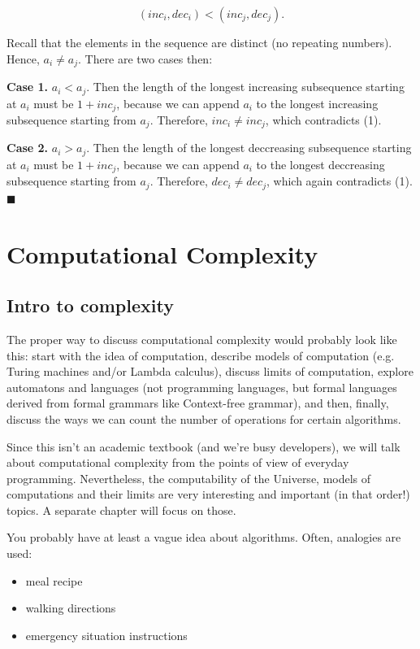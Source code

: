 \documentclass[a4paper, justified, notitlepage, sfsidenotes, notoc]{tufte-book}
\begin{document}
\begin{equation}
(inc_{i}, dec_{i}) < (inc_{j}, dec_{j}).
\end{equation}

Recall that the elements in the sequence are distinct (no repeating numbers). Hence, \(a_{i} \neq a_{j}\). There are two cases then:

\textbf{Case 1.} \(a_{i} < a_{j}\). Then the length of the longest increasing subsequence starting at \(a_{i}\) must be \(1 + inc_{j}\), because we can append \(a_{i}\) to the longest increasing subsequence starting from \(a_{j}\). Therefore, \(inc_{i} \neq inc_{j}\), which contradicts (1).

\textbf{Case 2.} \(a_{i} > a_{j}\). Then the length of the longest deccreasing subsequence starting at \(a_{i}\) must be \(1 + inc_{j}\), because we can append \(a_{i}\) to the longest deccreasing subsequence starting from \(a_{j}\). Therefore, \(dec_{i} \neq dec_{j}\), which again contradicts (1). \(\blacksquare\)

\part{Computational Complexity}
\label{sec:org7e33125}
\chapter{Intro to complexity}
\label{sec:orge22f2ad}

The proper way to discuss computational complexity would probably look like this: start with the idea of computation, describe models of computation (e.g. Turing machines and/or Lambda calculus), discuss limits of computation, explore automatons and languages (not programming languages, but formal languages derived from formal grammars like Context-free grammar), and then, finally, discuss the ways we can count the number of operations for certain algorithms.

Since this isn't an academic textbook (and we're busy developers), we will talk about computational complexity from the points of view of everyday programming. Nevertheless, the computability of the Universe, models of computations and their limits are very interesting and important (in that order!) topics. A separate chapter will focus on those.

You probably have at least a vague idea about algorithms. Often, analogies are used:

\begin{itemize}
\item meal recipe
\item walking directions
\item emergency situation instructions
\end{itemize}
\end{document}
